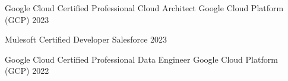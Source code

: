 

\begin{cvhonors}

  \cvhonor
    {Google Cloud Certified Professional Cloud Architect} %
    {Google Cloud Platform (GCP)} %
    {} %
    {2023} %

  \cvhonor
    {Mulesoft Certified Developer} %
    {Salesforce} %
    {} %
    {2023} %

  \cvhonor
    {Google Cloud Certified Professional Data Engineer} %
    {Google Cloud Platform (GCP)} %
    {} %
    {2022} %

\end{cvhonors}

